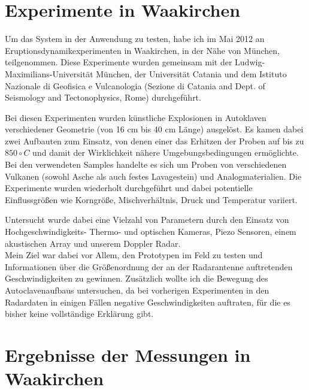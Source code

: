 \documentclass[12pt,a4paper]{scrartcl}
\begin{document}
\section{Experimente in Waakirchen}

Um das System in der Anwendung zu testen, habe ich im Mai 2012 an Eruptionsdynamikexperimenten in Waakirchen, in der Nähe von München, teilgenommen. Diese Experimente wurden gemeinsam mit der Ludwig-Maximilians-Universität München, der Universität Catania und dem Istituto Nazionale di Geofisica e Vulcanologia (Sezione di Catania and Dept. of Seismology and Tectonophysics, Rome) durchgeführt. 

Bei diesen Experimenten wurden künstliche Explosionen in Autoklaven \citep{Spieler:2004fk} verschiedener Geometrie (von 16 cm bis 40 cm Länge) ausgelöst. Es kamen dabei zwei Aufbauten zum Einsatz, von denen einer das Erhitzen der Proben auf bis zu $850\circ C$ und damit der Wirklichkeit nähere Umgebungsbedingungen ermöglichte. Bei den verwendeten Samples handelte es sich um Proben von verschiedenen Vulkanen (sowohl Asche als auch festes Lavagestein) und Analogmaterialien.
Die Experimente wurden wiederholt durchgeführt und dabei potentielle Einflussgrößen wie Korngröße, Mischverhältnis, Druck und Temperatur variiert.

Untersucht wurde dabei eine Vielzahl von Parametern durch den Einsatz von Hochgeschwindigkeits- Thermo- und optischen Kameras, Piezo Sensoren, einem akustischen Array und unserem Doppler Radar.\\

Mein Ziel war dabei vor Allem, den Prototypen im Feld zu testen und Informationen über die Größenordnung der an der Radarantenne auftretenden Geschwindigkeiten zu gewinnen. Zusätzlich wollte ich die Bewegung des Autoclavenaufbaus untersuchen, da bei vorherigen Experimenten in den Radardaten in einigen Fällen negative Geschwindigkeiten auftraten, für die es bisher keine vollständige Erklärung gibt. 


\section{Ergebnisse der Messungen in Waakirchen}
\end{document}
